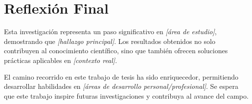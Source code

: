 \section{Reflexión Final}
\label{sec:reflexion}

Esta investigación representa un paso significativo en \textit{[área de estudio]}, demostrando que \textit{[hallazgo principal]}. Los resultados obtenidos no solo contribuyen al conocimiento científico, sino que también ofrecen soluciones prácticas aplicables en \textit{[contexto real]}.

El camino recorrido en este trabajo de tesis ha sido enriquecedor, permitiendo desarrollar habilidades en \textit{[áreas de desarrollo personal/profesional]}. Se espera que este trabajo inspire futuras investigaciones y contribuya al avance del campo.



